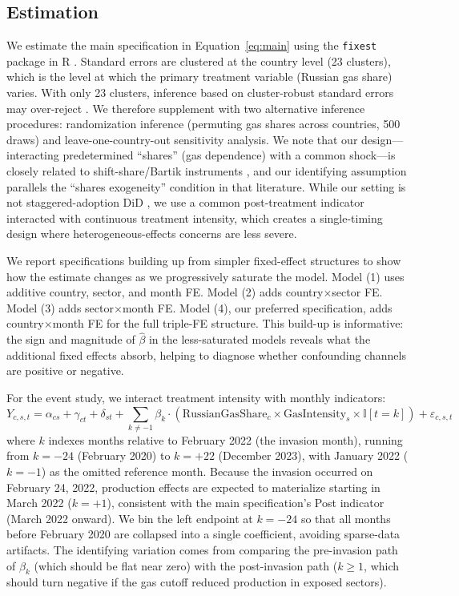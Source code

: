 \documentclass[12pt]{article}
\newcommand{\ind}{\mathbb{I}}
\begin{document}
\subsection{Estimation}

We estimate the main specification in Equation~\ref{eq:main} using the \texttt{fixest} package in R \citep{berge2018}. Standard errors are clustered at the country level (23 clusters), which is the level at which the primary treatment variable (Russian gas share) varies. With only 23 clusters, inference based on cluster-robust standard errors may over-reject \citep{cameron2008}. We therefore supplement with two alternative inference procedures: randomization inference (permuting gas shares across countries, 500 draws) and leave-one-country-out sensitivity analysis. We note that our design---interacting predetermined ``shares'' (gas dependence) with a common shock---is closely related to shift-share/Bartik instruments \citep{goldsmith2020,borusyak2022}, and our identifying assumption parallels the ``shares exogeneity'' condition in that literature. While our setting is not staggered-adoption DiD \citep{goodmanbacon2021,dechaisemartin2020,callaway2021}, we use a common post-treatment indicator interacted with continuous treatment intensity, which creates a single-timing design where heterogeneous-effects concerns are less severe.

We report specifications building up from simpler fixed-effect structures to show how the estimate changes as we progressively saturate the model. Model (1) uses additive country, sector, and month FE. Model (2) adds country$\times$sector FE. Model (3) adds sector$\times$month FE. Model (4), our preferred specification, adds country$\times$month FE for the full triple-FE structure. This build-up is informative: the sign and magnitude of $\hat{\beta}$ in the less-saturated models reveals what the additional fixed effects absorb, helping to diagnose whether confounding channels are positive or negative.

For the event study, we interact treatment intensity with monthly indicators:
\begin{equation}
Y_{c,s,t} = \alpha_{cs} + \gamma_{ct} + \delta_{st} + \sum_{k \neq -1} \beta_k \cdot (\text{RussianGasShare}_c \times \text{GasIntensity}_s \times \ind[t = k]) + \varepsilon_{c,s,t}
\label{eq:event}
\end{equation}
where $k$ indexes months relative to February 2022 (the invasion month), running from $k = -24$ (February 2020) to $k = +22$ (December 2023), with January 2022 ($k = -1$) as the omitted reference month. Because the invasion occurred on February 24, 2022, production effects are expected to materialize starting in March 2022 ($k = +1$), consistent with the main specification's Post indicator (March 2022 onward). We bin the left endpoint at $k = -24$ so that all months before February 2020 are collapsed into a single coefficient, avoiding sparse-data artifacts. The identifying variation comes from comparing the pre-invasion path of $\beta_k$ (which should be flat near zero) with the post-invasion path ($k \geq 1$, which should turn negative if the gas cutoff reduced production in exposed sectors).
\end{document}
